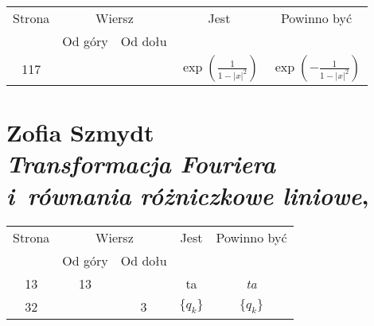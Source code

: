 \documentclass[a4paper,11pt]{article}
\numberwithin{equation}{section}
\begin{document}
\begin{center}

  \begin{tabular}{|c|c|c|c|c|}
    \hline
    Strona & \multicolumn{2}{c|}{Wiersz} & Jest
                              & Powinno być \\ \cline{2-3}
    & Od góry & Od dołu & & \\
    \hline
    117 & & & $\exp\left( \frac{ 1 }{ 1 - | x |^{ 2 } } \right)$
           & $\exp\left( -\frac{ 1 }{ 1 - | x |^{ 2 } } \right)$ \\
    \hline
  \end{tabular}

\end{center}

\VerSpaceTwo
















\newpage

\section{Zofia Szmydt \\
  \textit{Transformacja Fouriera i~równania różniczkowe liniowe},
  \cite{SzmydtTransformacjaFourieraIRownaniaRozniczkoweLiniowe1972}}




\begin{center}

  \begin{tabular}{|c|c|c|c|c|}
    \hline
    Strona & \multicolumn{2}{c|}{Wiersz} & Jest
                              & Powinno być \\ \cline{2-3}
    & Od góry & Od dołu & & \\
    \hline
    13  & 13 & & ta & \emph{ta} \\
    32  & &  3 & $\boldsymbol{ \{ } q_{ k } \}$ & $\{ q_{ k } \}$ \\
    \hline
  \end{tabular}

\end{center}
\end{document}
